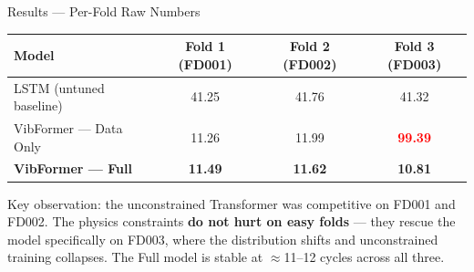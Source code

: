 \documentclass[10pt, aspectratio=169, handout]{beamer}
\newcommand{\bestcell}[1]{\cellcolor{Green!22}\textbf{#1}}
\begin{document}
\begin{frame}{Results --- Per-Fold Raw Numbers}
  \begin{table}
  \centering
  \small
  \setlength{\tabcolsep}{16pt}
  \renewcommand{\arraystretch}{1.5}
  \begin{tabular}{lccc}
    \toprule
    \textbf{Model}
      & \textbf{Fold 1 (FD001)}
      & \textbf{Fold 2 (FD002)}
      & \textbf{Fold 3 (FD003)} \\
    \midrule
    LSTM (untuned baseline)  & 41.25 & 41.76 & 41.32 \\
    \rowcolor{RowBg}
    VibFormer --- Data Only  & 11.26 & 11.99 & \textcolor{Red}{\textbf{99.39}} \\
    \bestcell{VibFormer --- Full}
      & \bestcell{11.49} & \bestcell{11.62} & \bestcell{10.81} \\
    \bottomrule
  \end{tabular}
  \end{table}
  \vspace{10pt}
  {\small
    Key observation: the unconstrained Transformer was competitive on FD001 and FD002.
    The physics constraints \textbf{do not hurt on easy folds} --- they rescue the model
    specifically on FD003, where the distribution shifts and unconstrained training
    collapses.  The Full model is stable at $\approx$11--12 cycles across all three.
  }
\end{frame}
\end{document}
